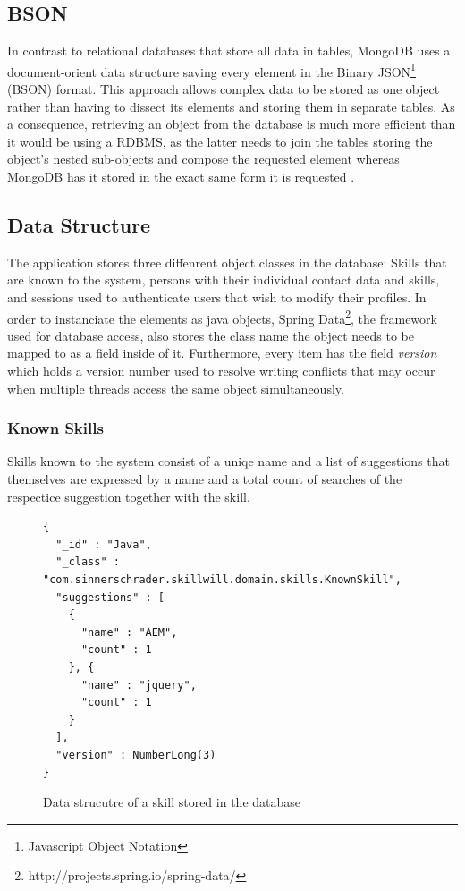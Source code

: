 \subsection{BSON}
\label{BSON}
In contrast to relational databases that store all data in tables, MongoDB uses a document-orient data structure saving every element in the Binary JSON\footnote{Javascript Object Notation} (BSON) format. This approach allows complex data to be stored as one object rather than having to dissect its elements and storing them in separate tables. As a consequence, retrieving an object from the database is much more efficient than it would be using a RDBMS, as the latter needs to join the tables storing the object's nested sub-objects and compose the requested element whereas MongoDB has it stored in the exact same form it is requested \cite[p. 10]{MongoGuide}.

\subsection{Data Structure}
The application stores three diffenrent object classes in the database: Skills that are known to the system, persons with their individual contact data and skills, and sessions used to authenticate users that wish to modify their profiles. In order to instanciate the elements as java objects, Spring Data\footnote{http://projects.spring.io/spring-data/}, the framework used for database access, also stores the class name the object needs to be mapped to as a field inside of it. Furthermore, every item has the field \textit{version} which holds a version number used to resolve writing conflicts that may occur when multiple threads access the same object simultaneously.

\subsubsection{Known Skills}
Skills known to the system consist of a uniqe name and a list of suggestions that themselves are expressed by a name and a total count of searches of the respectice suggestion together with the skill.
\begin{figure}
\begin{lstlisting}[language=JS]
{
  "_id" : "Java",
  "_class" : "com.sinnerschrader.skillwill.domain.skills.KnownSkill",
  "suggestions" : [
    {
      "name" : "AEM",
      "count" : 1
    }, {
      "name" : "jquery",
      "count" : 1
    }
  ],
  "version" : NumberLong(3)
}
\end{lstlisting}
\caption[Skill (DB Data Structure)]{Data strucutre of a skill stored in the database}
\end{figure}

